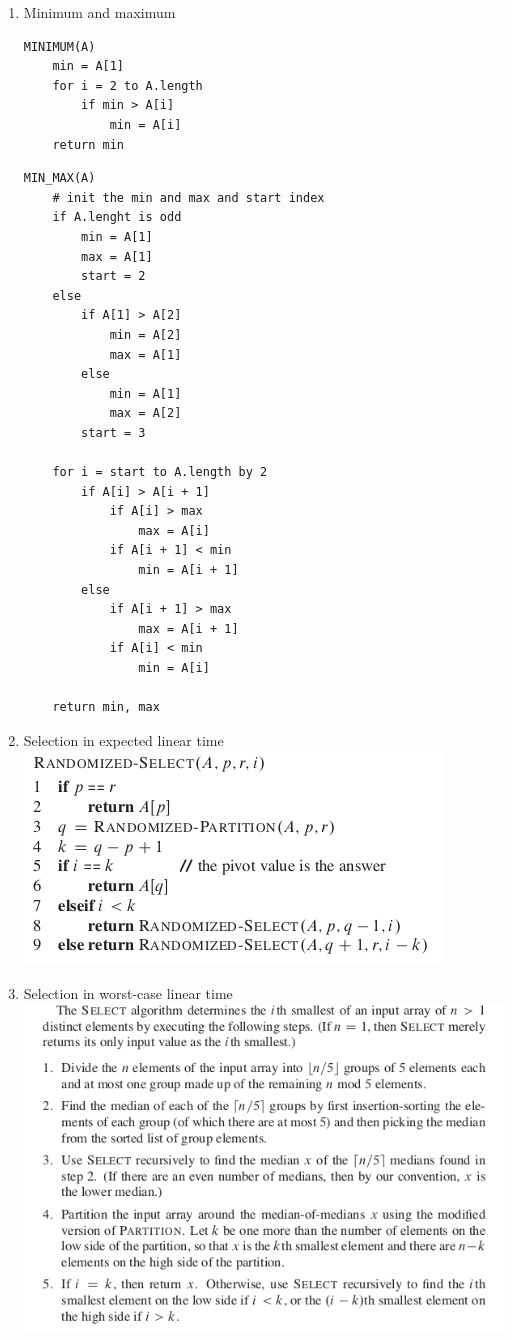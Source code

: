 \documentclass[11pt]{article}
\begin{document}
\begin{enumerate}
\item Minimum and maximum
\label{sec-4-1-2-1}
\begin{verbatim}
MINIMUM(A)
    min = A[1]
    for i = 2 to A.length
        if min > A[i]
            min = A[i]
    return min
\end{verbatim}


\begin{verbatim}
MIN_MAX(A)
    # init the min and max and start index
    if A.lenght is odd
        min = A[1]
        max = A[1]
        start = 2
    else
        if A[1] > A[2]
            min = A[2]
            max = A[1]
        else
            min = A[1]
            max = A[2]
        start = 3

    for i = start to A.length by 2
        if A[i] > A[i + 1]
            if A[i] > max
                max = A[i]
            if A[i + 1] < min
                min = A[i + 1]
        else
            if A[i + 1] > max
                max = A[i + 1]
            if A[i] < min
                min = A[i]
    
    return min, max
\end{verbatim}

\item Selection in expected linear time
\label{sec-4-1-2-2}
\includegraphics[width=.9\linewidth]{pics/c9_randomized_select.png} \\

\item Selection in worst-case linear time
\label{sec-4-1-2-3}
\includegraphics[width=.9\linewidth]{pics/c9_select.png} \\
\end{enumerate}
\end{document}
